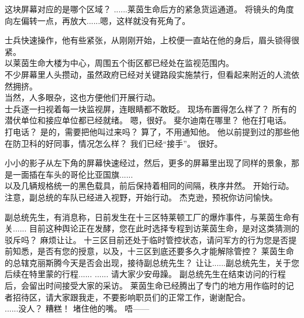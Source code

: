 \documentclass[openany]{book}
\begin{document}
\begin{dialogue}
     这块屏幕对应的是哪个区域？
     ......莱茵生命后方的紧急货运通道。
     将镜头的角度向左偏转一点，再放大......嗯，这样就没有死角了。\par
    士兵快速操作，他有些紧张，从刚刚开始，上校便一直站在他的身后，眉头锁得很紧。\\
    以莱茵生命大楼为中心，周围五个街区都已经处在监视范围内。\\
    不少屏幕里人头攒动，虽然政府已经对关键路段实施禁行，但看起来附近的人流依然拥挤。\\
    当然，人多眼杂，这也方便他们开展行动。\\
    士兵逐一扫视着每一块监视屏，连眼睛都不敢眨。
     现场布置得怎么样了？
     所有的潜伏单位和接应单位都已经就绪。
     嗯，很好。
     斐尔迪南在哪里？
     他在打电话。
     打电话？
     是的，需要把他叫过来吗？
     算了，不用通知他。
     他以前提到过的那些他在防卫科的好同事，情况怎么样？
     我们已经“接手”。
     很好。\par
    小小的影子从左下角的屏幕快速经过，然后，更多的屏幕里出现了同样的景象，那是一面插在车头的哥伦比亚国旗......\\
    以及几辆规格统一的黑色载具，前后保持着相同的间隔，秩序井然。
     开始行动。
     注意，副总统的车队已经进入视野，开始行动。
     杰克逊，预祝你访问愉快。
\end{dialogue}

\begin{dialogue}
     副总统先生，有消息称，日前发生在十三区特莱顿工厂的爆炸事件，与莱茵生命有关......
     目前这种舆论正在发酵，您在此时选择专程到访莱茵生命，是对这类猜测的驳斥吗？
     麻烦让让。
     十三区目前还处于临时管控状态，请问军方的行为您是否提前知悉，是否有您的授意，以及，十三区到底还要多久才能解除管控？
     莱茵生命的总辖克丽斯腾今天是否会出现，接待副总统先生？
     让让......副总统先生，关于您后续在特里蒙的行程......
     ......
     请大家少安毋躁。
     副总统先生在结束访问的行程后，会留出时间接受大家的采访。
     莱茵生命已经腾出了专门的地方用作临时的记者招待区，请大家跟我走，不要影响职员们的正常工作，谢谢配合。
    \\
     ......没人？
     糟糕！
     堵住他的嘴。
     唔——
\end{dialogue}
\end{document}
